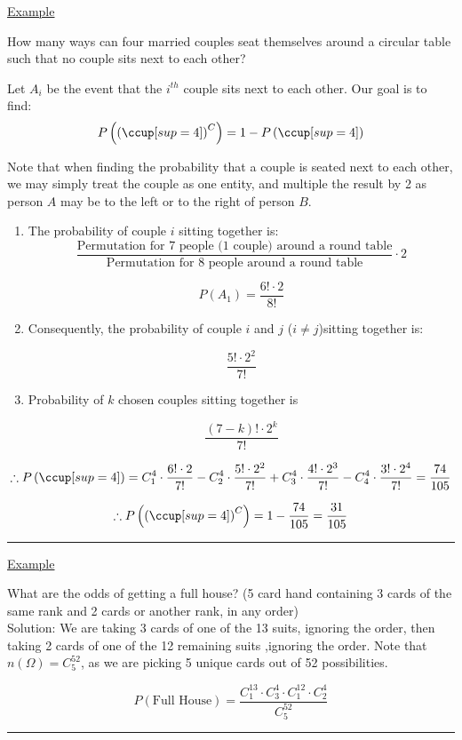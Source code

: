 \documentclass[12pt]{article}
\newcommand{\pp}[1]{\left(#1\right)}
\newcommand{\divider}[0]{\par\textcolor{lightgray}{\rule{\textwidth}{0.1pt}}}
\newenvironment{example}{\shownto{-,notes}\underline{Example}\par}{\par\divider\endshownto}
\begin{document}
\begin{example}
	How many ways can four married couples seat themselves around a circular table such that no couple sits next to each other?
	
	Let $A_i$ be the event that the $i^{th}$ couple sits next to each other. Our goal is to find:
	$$P\pp{\pp{\ccup[sup=4]}^C} = 1 - P\pp{\ccup[sup=4]}$$
	
	Note that when finding the probability that a couple is seated next to each other, we may simply treat the couple as one entity, and multiple the result by 2 as person $A$ may be to the left or to the right of person $B$.
	
	\begin{enumerate}
		\item The probability of couple $i$ sitting together is:
		$$\frac{\text{Permutation for 7 people (1 couple) around a round table}}{\text{Permutation for 8 people around a round table}} \cdot 2$$
		
		$$P(A_1) = \frac{6! \cdot 2}{8!}$$
		
		\item Consequently, the probability of couple $i$ and $j$ ($i \ne j$)sitting together is:
		
		$$\frac{5! \cdot 2^2}{7!}$$
		
		\item Probability of $k$ chosen couples sitting together is
		
		$$\frac{(7 - k)! \cdot 2^k}{7!}$$
	\end{enumerate}

	$$\therefore P\pp{\ccup[sup=4]} = C^4_1 \cdot \frac{6! \cdot 2}{7!} - C^4_2 \cdot \frac{5! \cdot 2^2}{7!} + C^4_3 \cdot \frac{4! \cdot 2^3}{7!} - C^4_4 \cdot \frac{3! \cdot 2^4}{7!} = \frac{74}{105}$$
	
	$$\therefore P\pp{\pp{\ccup[sup=4]}^C} = 1 - \frac{74}{105} = \frac{31}{105}$$
\end{example}

\begin{example}
	What are the odds of getting a full house? (5 card hand containing 3 cards of the same rank and 2 cards or another rank, in any order) \\
	
	Solution: We are taking 3 cards of one of the 13 suits, ignoring the order, then taking 2 cards of one of the 12 remaining suits ,ignoring the order. Note that $n(\Omega) = C^{52}_5$, as we are picking 5 unique cards out of 52 possibilities.
	
	$$P(\text{Full House}) = \frac{C^{13}_1 \cdot C^4_3 \cdot C^{12}_1 \cdot C^4_2}{C^{52}_5}$$
\end{example}
\end{document}
